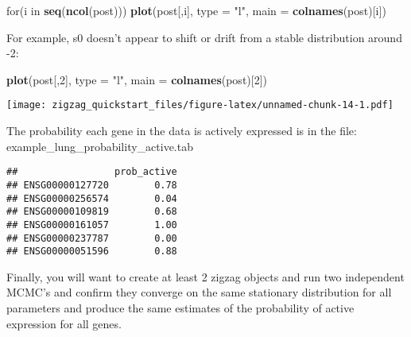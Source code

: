\documentclass[]{article}
\newenvironment{Shaded}{\begin{snugshade}}{\end{snugshade}}
\newcommand{\KeywordTok}[1]{\textcolor[rgb]{0.13,0.29,0.53}{\textbf{{#1}}}}
\newcommand{\DataTypeTok}[1]{\textcolor[rgb]{0.13,0.29,0.53}{{#1}}}
\newcommand{\DecValTok}[1]{\textcolor[rgb]{0.00,0.00,0.81}{{#1}}}
\newcommand{\StringTok}[1]{\textcolor[rgb]{0.31,0.60,0.02}{{#1}}}
\newcommand{\NormalTok}[1]{{#1}}
\begin{document}
\begin{Shaded}
\begin{Highlighting}[]
\NormalTok{for(i in }\KeywordTok{seq}\NormalTok{(}\KeywordTok{ncol}\NormalTok{(post))) }\KeywordTok{plot}\NormalTok{(post[,i], }\DataTypeTok{type =} \StringTok{"l"}\NormalTok{, }\DataTypeTok{main =} \KeywordTok{colnames}\NormalTok{(post)[i])}
\end{Highlighting}
\end{Shaded}

For example, s0 doesn't appear to shift or drift from a stable
distribution around -2:

\begin{Shaded}
\begin{Highlighting}[]
\KeywordTok{plot}\NormalTok{(post[,}\DecValTok{2}\NormalTok{], }\DataTypeTok{type =} \StringTok{"l"}\NormalTok{, }\DataTypeTok{main =} \KeywordTok{colnames}\NormalTok{(post)[}\DecValTok{2}\NormalTok{])}
\end{Highlighting}
\end{Shaded}

\texttt{[image: zigzag\_quickstart\_files/figure-latex/unnamed-chunk-14-1.pdf]}

The probability each gene in the data is actively expressed is in the
file: example\_lung\_probability\_active.tab

\begin{verbatim}
##                 prob_active
## ENSG00000127720        0.78
## ENSG00000256574        0.04
## ENSG00000109819        0.68
## ENSG00000161057        1.00
## ENSG00000237787        0.00
## ENSG00000051596        0.88
\end{verbatim}

Finally, you will want to create at least 2 zigzag objects and run two
independent MCMC's and confirm they converge on the same stationary
distribution for all parameters and produce the same estimates of the
probability of active expression for all genes.
\end{document}
